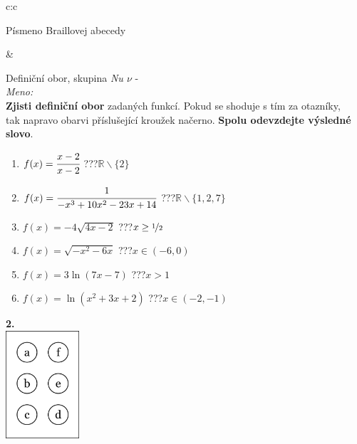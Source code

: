 \documentclass[10pt]{report}
\begin{document}
\begin{tabular}{c:c}
\begin{minipage}[c][99mm][t]{0.49\linewidth}
\begin{center}
\begin{minipage}{0.20\linewidth}
\begin{center}
{\small Písmeno Braillovej abecedy}
\end{center}
\end{minipage}
\end{center}
\end{minipage}
&
\begin{minipage}[c][99mm][t]{0.49\linewidth}
\begin{center}
\vspace{7mm}
{\huge Definiční obor, skupina \textit{Nu $\nu$} -}\\[4.5mm]
\textit{Meno:}\phantom{xxxxxxxxxxxxxxxxxxxxxxxxxxxxxxxxxxxxxxxxxxxxxxxxxxxxxxxxxxxxxxxxx}\\[3.5mm]
\textbf{Zjisti definiční obor} zadaných funkcí. Pokud se shoduje s tím za otazníky,\\tak napravo obarvi příslušející kroužek načerno. \textbf{Spolu odevzdejte výsledné slovo}.\\[3mm]
\begin{minipage}{0.77\linewidth}
\begin{center}
\begin{varwidth}{\textwidth}
\begin{enumerate}
\normalsize
\item $f(x)=\cfrac{x-2}{x-2}$\quad \dotfill\; ???\;\dotfill \quad $\mathbb{R}\smallsetminus\{2\}$
\item $f(x)=\cfrac{1}{-x^3+10x^2-23x+14}$\quad \dotfill\; ???\;\dotfill \quad $\mathbb{R}\smallsetminus\{1,2,7\}$
\item $f(x)=-4\sqrt{4x-2}$\quad \dotfill\; ???\;\dotfill \quad $x\geq\nicefrac{1}{2}$
\item $f(x)=\sqrt{-x^2-6x}$\quad \dotfill\; ???\;\dotfill \quad $x\in(-6 , 0)$
\item $f(x)=3\ln{(7x-7)}$\quad \dotfill\; ???\;\dotfill \quad $x>1$
\item $f(x)=\ln{(x^2+3x+2)}$\quad \dotfill\; ???\;\dotfill \quad $x\in(-2 , -1)$
\end{enumerate}
\end{varwidth}
\end{center}
\end{minipage}
\begin{minipage}{0.20\linewidth}
\begin{center}
{\Huge\bfseries 2.} \\[2mm]
\includegraphics[height=40mm]{../images/braille.png}

\end{center}
\end{minipage}
\end{center}
\end{minipage}
\end{tabular}
\end{document}
